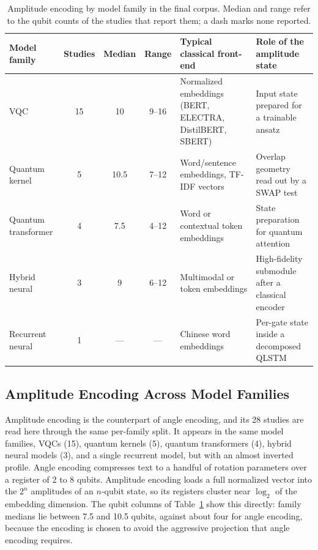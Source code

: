 \documentclass{ieeeaccess}
\begin{document}
\begin{table}[t!]
\caption{Amplitude encoding by model family in the final corpus. Median and range refer to the qubit counts of the studies that report them; a dash marks none reported.}
\label{tab:amplitude_by_family}
\centering
\footnotesize
\renewcommand{\arraystretch}{1.3}
\setlength{\tabcolsep}{5pt}
\begin{tabular}{@{}l c c c p{} p{}@{}}
\hline
\textbf{Model family} & \textbf{Studies} & \textbf{Median} & \textbf{Range} & \textbf{Typical classical front-end} & \textbf{Role of the amplitude state} \\
\hline
VQC & 15 & 10 & 9--16 & \raggedright Normalized embeddings (BERT, ELECTRA, DistilBERT, SBERT) & \raggedright Input state prepared for a trainable ansatz \tabularnewline
Quantum kernel & 5 & 10.5 & 7--12 & \raggedright Word/sentence embeddings, TF-IDF vectors & \raggedright Overlap geometry read out by a SWAP test \tabularnewline
Quantum transformer & 4 & 7.5 & 4--12 & \raggedright Word or contextual token embeddings & \raggedright State preparation for quantum attention \tabularnewline
Hybrid neural & 3 & 9 & 6--12 & \raggedright Multimodal or token embeddings & \raggedright High-fidelity submodule after a classical encoder \tabularnewline
Recurrent neural & 1 & --- & --- & \raggedright Chinese word embeddings & \raggedright Per-gate state inside a decomposed QLSTM \tabularnewline
\hline
\end{tabular}
\end{table}

\subsection{Amplitude Encoding Across Model Families}
\label{subsec:amplitude_across_families}

Amplitude encoding is the counterpart of angle encoding, and its 28 studies are read here through the same per-family split. It appears in the same model families, VQCs (15), quantum kernels (5), quantum transformers (4), hybrid neural models (3), and a single recurrent model, but with an almost inverted profile. Angle encoding compresses text to a handful of rotation parameters over a register of 2 to 8 qubits. Amplitude encoding loads a full normalized vector into the $2^{n}$ amplitudes of an $n$-qubit state, so its registers cluster near $\log_2$ of the embedding dimension. The qubit columns of Table~\ref{tab:amplitude_by_family} show this directly: family medians lie between 7.5 and 10.5 qubits, against about four for angle encoding, because the encoding is chosen to avoid the aggressive projection that angle encoding requires.
\end{document}
